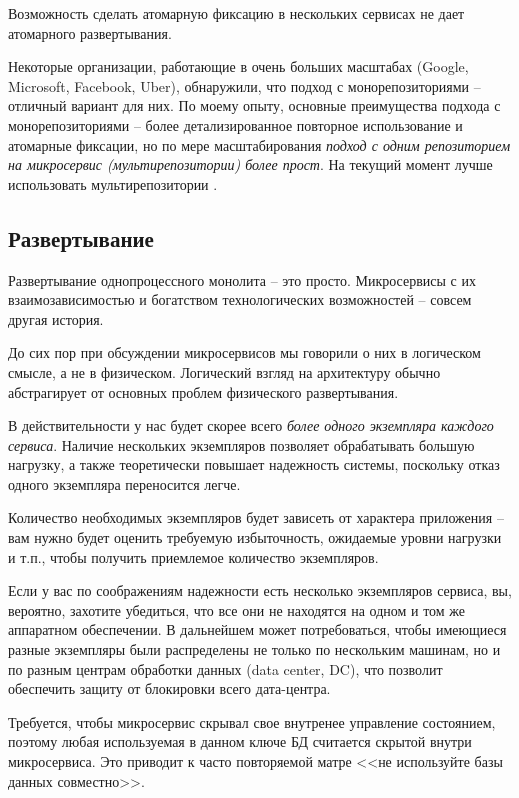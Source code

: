 \documentclass[%
	11pt,
	a4paper,
	utf8,
		]{article}
\begin{document}
Возможность сделать атомарную фиксацию в нескольких сервисах не дает атомарного развертывания. 

Некоторые организации, работающие в очень больших масштабах (Google, Microsoft, Facebook, Uber), обнаружили, что подход с монорепозиториями -- отличный вариант для них. По моему опыту, основные преимущества подхода с монорепозиториями -- более детализированное повторное использование и атомарные фиксации, но по мере масштабирования \emph{подход с одним репозиторием на микросервис (мультирепозитории) более прост}. На текущий момент лучше использовать мультирепозитории \cite[]{microservices-2024}.

\subsection{Развертывание}

Развертывание однопроцессного монолита -- это просто. Микросервисы с их взаимозависимостью и богатством технологических возможностей -- совсем другая история.

До сих пор при обсуждении микросервисов мы говорили о них в логическом смысле, а не в физическом. Логический взгляд на архитектуру обычно абстрагирует от основных проблем физического развертывания.

В действительности у нас будет скорее всего \emph{более одного экземпляра каждого сервиса}. Наличие нескольких экземпляров позволяет обрабатывать большую нагрузку, а также теоретически повышает надежность системы, поскольку отказ одного экземпляра переносится легче. 

Количество необходимых экземпляров будет зависеть от характера приложения -- вам нужно будет оценить требуемую избыточность, ожидаемые уровни нагрузки и т.п., чтобы получить приемлемое количество экземпляров. 

Если у вас по соображениям надежности есть несколько экземпляров сервиса, вы, вероятно, захотите убедиться, что все они не находятся на одном и том же аппаратном обеспечении. В дальнейшем может потребоваться, чтобы имеющиеся разные экземпляры были распределены не только по нескольким машинам, но и по разным центрам обработки данных (data center, DC), что позволит обеспечить защиту от блокировки всего дата-центра.

Требуется, чтобы микросервис скрывал свое внутренее управление состоянием, поэтому любая используемая в данном ключе БД считается скрытой внутри микросервиса. Это приводит к часто повторяемой матре <<не используйте базы данных совместно>>.
\end{document}
